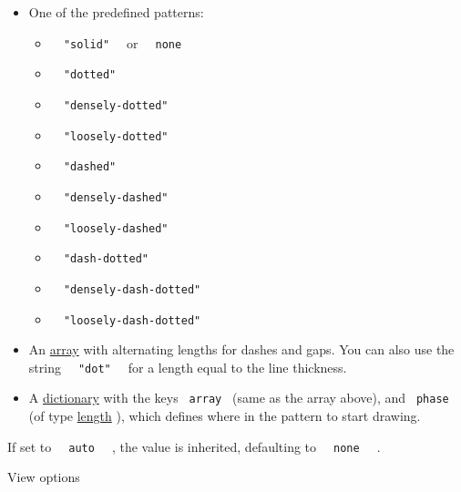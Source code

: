 \begin{itemize}
\tightlist
\item
  One of the predefined patterns:

  \begin{itemize}
  \tightlist
  \item
    \texttt{\ }{\texttt{\ "solid"\ }}\texttt{\ } or
    \texttt{\ }{\texttt{\ none\ }}\texttt{\ }
  \item
    \texttt{\ }{\texttt{\ "dotted"\ }}\texttt{\ }
  \item
    \texttt{\ }{\texttt{\ "densely-dotted"\ }}\texttt{\ }
  \item
    \texttt{\ }{\texttt{\ "loosely-dotted"\ }}\texttt{\ }
  \item
    \texttt{\ }{\texttt{\ "dashed"\ }}\texttt{\ }
  \item
    \texttt{\ }{\texttt{\ "densely-dashed"\ }}\texttt{\ }
  \item
    \texttt{\ }{\texttt{\ "loosely-dashed"\ }}\texttt{\ }
  \item
    \texttt{\ }{\texttt{\ "dash-dotted"\ }}\texttt{\ }
  \item
    \texttt{\ }{\texttt{\ "densely-dash-dotted"\ }}\texttt{\ }
  \item
    \texttt{\ }{\texttt{\ "loosely-dash-dotted"\ }}\texttt{\ }
  \end{itemize}
\item
  An \href{/docs/reference/foundations/array/}{array} with alternating
  lengths for dashes and gaps. You can also use the string
  \texttt{\ }{\texttt{\ "dot"\ }}\texttt{\ } for a length equal to the
  line thickness.
\item
  A \href{/docs/reference/foundations/dictionary/}{dictionary} with the
  keys \texttt{\ array\ } (same as the array above), and
  \texttt{\ phase\ } (of type
  \href{/docs/reference/layout/length/}{length} ), which defines where
  in the pattern to start drawing.
\end{itemize}

If set to \texttt{\ }{\texttt{\ auto\ }}\texttt{\ } , the value is
inherited, defaulting to \texttt{\ }{\texttt{\ none\ }}\texttt{\ } .


View options

